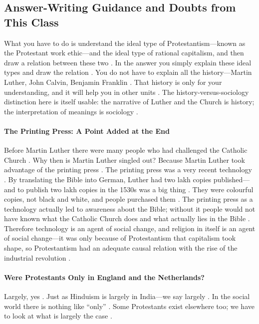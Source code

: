 \subsection{Answer-Writing Guidance and Doubts from This Class}

\begin{PYQLink}
What you have to do is understand the ideal type of Protestantism---known as the Protestant work ethic---and the ideal type of rational capitalism, and then draw a relation between these two .
In the answer you simply explain these ideal types and draw the relation . You do not have to explain all the history---Martin Luther, John Calvin, Benjamin Franklin . That history is only for your understanding, and it will help you in other units .
The history-versus-sociology distinction here is itself usable: the narrative of Luther and the Church is history; the interpretation of meanings is sociology .
\end{PYQLink}

\paragraph{The Printing Press: A Point Added at the End}
\begin{GovtPolicy}
Before Martin Luther there were many people who had challenged the Catholic Church . Why then is Martin Luther singled out? Because Martin Luther took advantage of the printing press .
The printing press was a very recent technology . By translating the Bible into German, Luther had two lakh copies published---and to publish two lakh copies in the 1530s was a big thing . They were colourful copies, not black and white, and people purchased them .
The printing press as a technology actually led to awareness about the Bible; without it people would not have known what the Catholic Church does and what actually lies in the Bible .
Therefore technology is an agent of social change, and religion in itself is an agent of social change---it was only because of Protestantism that capitalism took shape, so Protestantism had an adequate causal relation with the rise of the industrial revolution .
\end{GovtPolicy}

\paragraph{Were Protestants Only in England and the Netherlands?}
Largely, yes . Just as Hinduism is largely in India---we say largely . In the social world there is nothing like ``only'' . Some Protestants exist elsewhere too; we have to look at what is largely the case .

